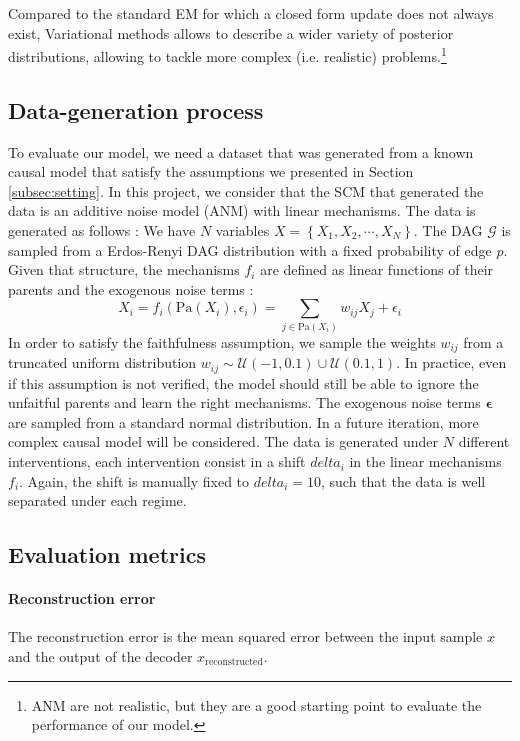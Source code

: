 \documentclass{article}
\begin{document}
Compared to the standard EM for which a closed form update does not always exist, Variational methods allows to describe a wider variety of posterior distributions, allowing to tackle more complex (i.e. realistic) problems.\footnote{ANM are not realistic, but they are a good starting point to evaluate the performance of our model.}


\subsection{Data-generation process}

To evaluate our model, we need a dataset that was generated from a known causal model that satisfy the assumptions we presented in Section \ref{subsec:setting}.
In this project, we consider that the SCM that generated the data is an additive noise model (ANM) with linear mechanisms. The data is generated as follows : We have $N$ variables $X = \left\{ X_1, X_2, \cdots, X_N \right\}$.  The DAG $\mathcal{G}$ is sampled from a Erdos-Renyi DAG distribution with a fixed probability of edge $p$. Given that structure, the mechanisms $f_i$ are defined as linear functions of their parents and the exogenous noise terms :
\begin{equation}
    X_i = f_i(\text{Pa}(X_i), \epsilon_i) =
    \sum_{j \in \text{Pa}(X_i)} w_{ij} X_j + \epsilon_i
\end{equation}
In order to satisfy the faithfulness assumption, we sample the weights $w_{ij}$ from a truncated uniform distribution $w_{ij} \sim \mathcal{U}(-1,0.1) \cup \mathcal{U}(0.1,1)$. In practice, even if this assumption is not verified, the model should still be able to ignore the unfaitful parents and learn the right mechanisms. The exogenous noise terms $\boldsymbol{\epsilon}$ are sampled from a standard normal distribution. In a future iteration, more complex causal model will be considered. The data is generated under $N$ different interventions, each intervention consist in a shift $delta_i$ in the linear mechanisms $f_i$. Again, the shift is manually fixed to $delta_i = 10$, such that the data is well separated under each regime.

\subsection{Evaluation metrics}

\paragraph{Reconstruction error} The reconstruction error is the mean squared error between the input sample $x$ and the output of the decoder $x_{\text{reconstructed}}$.
\end{document}
